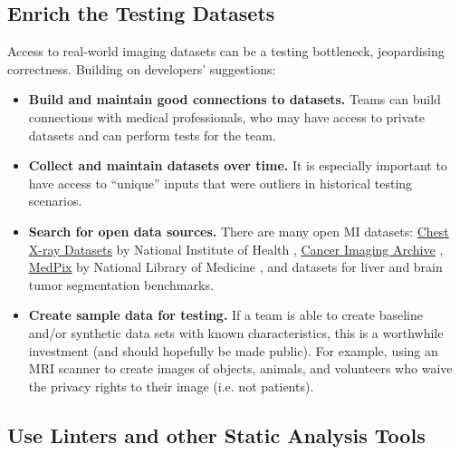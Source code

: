 \documentclass[doubleblind,12pt, 3p, times]{elsarticle}
\begin{document}
\subsection{Enrich the Testing Datasets} 
\label{sec_recommendations_testing_dataset}

Access to real-world imaging datasets can be a testing bottleneck,
jeopardising correctness. Building on developers' suggestions:

\begin{itemize}
\item \textbf{Build and maintain good connections to datasets.} 
Teams can build
connections with medical professionals, who may have
access to private datasets and can perform tests for the team.

\item \textbf{Collect and maintain datasets over time.} It is especially
important to have access to ``unique'' inputs that were outliers in
historical testing scenarios.

\item \textbf{Search for open data sources.} There are many open MI
datasets:
\href{https://nihcc.app.box.com/v/ChestXray-NIHCC}{Chest X-ray Datasets} by
National Institute of Health \cite{WangEtAl2017},
\href{https://www.cancerimagingarchive.net/}{Cancer Imaging Archive}
\cite{PriorEtAl2017}, \href{https://medpix.nlm.nih.gov/home}{MedPix} by
National Library of Medicine \cite{Smirniotopoulos2014}, and datasets for liver
\cite{BilicEtAl2019} and brain \cite{MenzeEtAl2015} tumor segmentation
benchmarks.

\item \textbf{Create sample data for testing.} If a team is able to create
baseline and/or synthetic data sets with known characteristics, this is a
worthwhile investment (and should hopefully be made public). For example, using
an MRI scanner to create images of objects, animals, and volunteers who waive
the privacy rights to their image (i.e. not patients).

%

\end{itemize}

\subsection{Use Linters and other Static Analysis Tools} \label{Sec_Linters}
\end{document}

